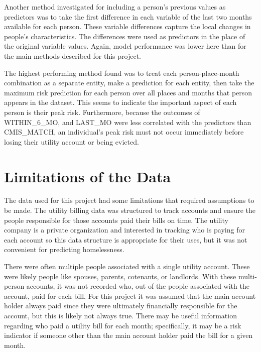 \documentclass[12pt]{report}
\begin{document}
Another method investigated for including a person's previous values as predictors was to take the first difference in each variable of the last two months available for each person. These variable differences capture the local changes in people's characteristics. The differences were used as predictors in the place of the original variable values. Again, model performance was lower here than for the main methods described for this project.

The highest performing method found was to treat each person-place-month combination as a separate entity, make a prediction for each entity, then take the maximum risk prediction for each person over all places and months that person appears in the dataset. This seems to indicate the important aspect of each person is their peak risk. Furthermore, because the outcomes of WITHIN\_6\_MO, and LAST\_MO were less correlated with the predictors than CMIS\_MATCH, an individual's peak risk must not occur immediately before losing their utility account or being evicted. 

\section{Limitations of the Data}
The data used for this project had some limitations that required assumptions to be made. The utility billing data was structured to track accounts and ensure the people responsible for those accounts paid their bills on time. The utility company is a private organization and interested in tracking who is paying for each account so this data structure is appropriate for their uses, but it was not convenient for predicting homelessness.

There were often multiple people associated with a single utility account. These were likely people like spouses, parents, cotenants, or landlords. With these multi-person accounts, it was not recorded who, out of the people associated with the account, paid for each bill. For this project it was assumed that the main account holder always paid since they were ultimately financially responsible for the account, but this is likely not always true. There may be useful information regarding who paid a utility bill for each month; specifically, it may be a risk indicator if someone other than the main account holder paid the bill for a given month.
\end{document}
